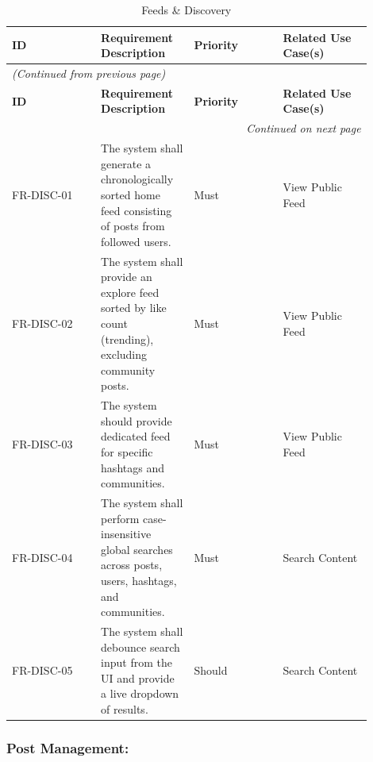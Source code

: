 \begin{longtable}{|p{0.225\linewidth}|p{0.225\linewidth}|p{0.225\linewidth}|p{0.225\linewidth}|}
\caption{Feeds \& Discovery} \label{tab:6} \\
\hline
\textbf{ID} & \textbf{Requirement Description} & \textbf{Priority} & \textbf{Related Use Case(s)} \\
\hline
\endfirsthead
\multicolumn{4}{l}{\textit{(Continued from previous page)}} \\
\hline
\textbf{ID} & \textbf{Requirement Description} & \textbf{Priority} & \textbf{Related Use Case(s)} \\
\hline
\endhead
\hline \multicolumn{4}{r}{\textit{Continued on next page}} \\
\endfoot
\hline
\endlastfoot
FR-DISC-01 & The system shall generate a chronologically sorted home feed consisting of posts from followed users. & Must & View Public Feed \\
\hline
FR-DISC-02 & The system shall provide an explore feed sorted by like count (trending), excluding community posts. & Must & View Public Feed \\
\hline
FR-DISC-03 & The system should provide dedicated feed for specific hashtags and communities. & Must & View Public Feed \\
\hline
FR-DISC-04 & The system shall perform case-insensitive global searches across posts, users, hashtags, and communities. & Must & Search Content \\
\hline
FR-DISC-05 & The system shall debounce search input from the UI and provide a live dropdown of results. & Should & Search Content \\
\hline
\end{longtable}


\subsubsection{Post Management:}

